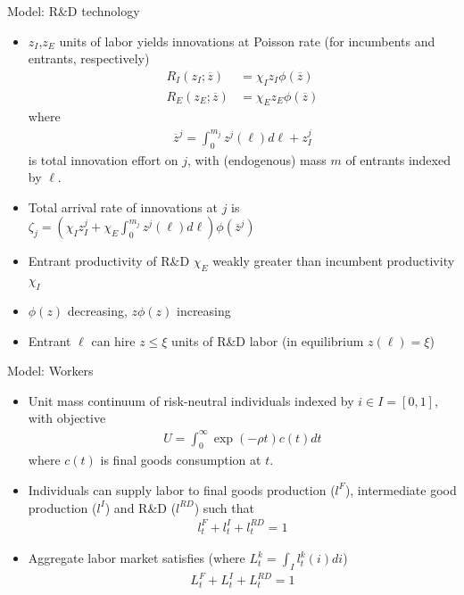 \documentclass[english,usenames,dvipsnames]{beamer}
\begin{document}
\begin{frame}{Model: R\&D technology}
\begin{itemize}
	\small
	\item $z_I$,$z_E$ units of labor yields innovations at Poisson rate (for incumbents and entrants, respectively)
	\begin{align*}
	R_I(z_I;\overline{z}) &= \chi_I z_I \phi(\overline{z}) \\
	R_E(z_E;\overline{z}) &= \chi_E z_E \phi(\overline{z}) 
	\end{align*}
	where 
	\begin{align*}
	\overline{z}^j = \int_0^{m_j} z^j(\ell)d\ell + z^j_I
	\end{align*}
	is total innovation effort on $j$, with (endogenous) mass $m$ of entrants indexed by $\ell$.
	\item Total arrival rate of innovations at $j$ is $\zeta_j = (\chi_I z^j_I + \chi_E \int_0^{m_j} z^j(\ell)d\ell) \phi(\overline{z}^j)$
	\item Entrant productivity of R\&D $\chi_E$ weakly greater than incumbent productivity $\chi_I$
	\item $\phi(z)$ decreasing, $z\phi(z)$ increasing
	\item Entrant $\ell$ can hire $z\le\xi$ units of R\&D labor (in equilibrium $z(\ell) = \xi$)
\end{itemize}
\end{frame}



\begin{frame}{Model: Workers}
\begin{itemize}
	\item Unit mass continuum of risk-neutral individuals indexed by $i\in I =[0,1]$, with objective
	\begin{align*}
	U = \int_0^{\infty}\exp(-\rho t)c(t)dt
	\end{align*}
	where $c(t)$ is final goods consumption at $t$.
	\item Individuals can supply labor to final goods production ($l^F$), intermediate good production ($l^I$) and R\&D ($l^{RD}$) such that 
	\begin{align*}
	l_t^F+ l_t^I + l_t^{RD} = 1
	\end{align*}
	\item Aggregate labor market satisfies (where $L_t^k = \int_I l_t^k(i)di$)
	\begin{align*}
	L_t^F + L_t^I + L_t^{RD} = 1
	\end{align*}
\end{itemize}
\end{frame}
\end{document}
